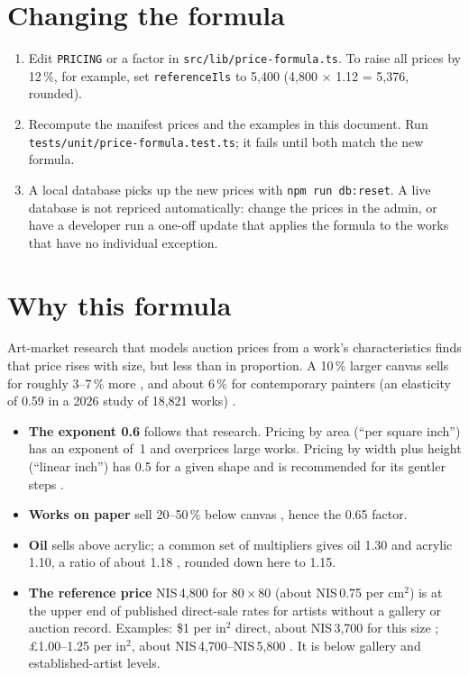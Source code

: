 \documentclass[11pt,a4paper]{article}
\newcommand{\nis}[1]{NIS\,#1}
\newcommand{\code}[1]{\nolinkurl{#1}}  %
\begin{document}
\section{Changing the formula}
\begin{enumerate}
  \item Edit \code{PRICING} or a factor in \code{src/lib/price-formula.ts}. To raise all prices by
    12\,\%, for example, set \code{referenceIls} to 5{,}400 (4{,}800 $\times$ 1.12 = 5{,}376,
    rounded).
  \item Recompute the manifest prices and the examples in this document. Run
    \code{tests/unit/price-formula.test.ts}; it fails until both match the new formula.
  \item A local database picks up the new prices with \texttt{npm run db:reset}. A live database is
    not repriced automatically: change the prices in the admin, or have a developer run a one-off
    update that applies the formula to the works that have no individual exception.
\end{enumerate}

\section{Why this formula}
Art-market research that models auction prices from a work's characteristics finds that price
rises with size, but less than in proportion. A 10\,\% larger canvas sells for roughly 3--7\,\%
more \cite{masterworks,renneboog}, and about 6\,\% for contemporary painters (an elasticity of
0.59 in a 2026 study of 18{,}821 works) \cite{orstavik}.
\begin{itemize}
  \item \textbf{The exponent 0.6} follows that research. Pricing by area (``per square inch'') has an
    exponent of~1 and overprices large works. Pricing by width plus height (``linear inch'') has
    0.5 for a given shape and is recommended for its gentler steps \cite{foundmyself}.
  \item \textbf{Works on paper} sell 20--50\,\% below canvas \cite{milan,masterworks}, hence the
    0.65 factor.
  \item \textbf{Oil} sells above acrylic; a common set of multipliers gives oil 1.30 and acrylic 1.10,
    a ratio of about 1.18 \cite{priceyourpainting}, rounded down here to 1.15.
  \item \textbf{The reference price} \nis{4{,}800} for $80\times80$ (about \nis{0.75} per cm$^2$) is
    at the upper end of published direct-sale rates for artists without a gallery or auction
    record. Examples: \$1 per in$^2$ direct, about \nis{3{,}700} for this size \cite{milan};
    \pounds1.00--1.25 per in$^2$, about \nis{4{,}700}--\nis{5{,}800} \cite{priceyourpainting}.
    It is below gallery and established-artist levels.
\end{itemize}
\end{document}
